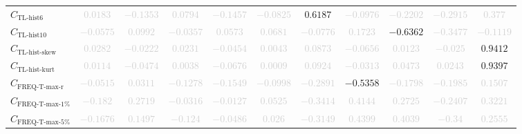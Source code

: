 \documentclass{standalone}
\newcommand{\tlhistsixname}{\text{TL-hist6}}
\newcommand{\tlhistsix}{C_{\tlhistsixname}}
\newcommand{\tlhisttenname}{\text{TL-hist10}}
\newcommand{\tlhistten}{C_{\tlhisttenname}}
\newcommand{\tlskewhistname}{\text{TL-hist-skew}}
\newcommand{\tlskewhist}{C_{\tlskewhistname}}
\newcommand{\tlkurthistname}{\text{TL-hist-kurt}}
\newcommand{\tlkurthist}{C_{\tlkurthistname}}
\newcommand{\freqmaxrname}{\text{FREQ-T-max-r}}
\newcommand{\freqmaxr}{C_{\freqmaxrname}}
\newcommand{\freqmaxonename}{\text{FREQ-T-max-1\%}}
\newcommand{\freqmaxone}{C_{\freqmaxonename}}
\newcommand{\freqmaxfivename}{\text{FREQ-T-max-5\%}}
\newcommand{\freqmaxfive}{C_{\freqmaxfivename}}
\begin{document}
\begin{tabular}{lcccccccccc}
$\tlhistsix$ & \textcolor{lightgray}{$0.0183$} & \textcolor{lightgray}{$-0.1353$} & \textcolor{lightgray}{$0.0794$} & \textcolor{lightgray}{$-0.1457$} & \textcolor{lightgray}{$-0.0825$} & $0.6187$ & \textcolor{lightgray}{$-0.0976$} & \textcolor{lightgray}{$-0.2202$} & \textcolor{lightgray}{$-0.2915$} & \textcolor{lightgray}{$0.377$} \\ 
$\tlhistten$ & \textcolor{lightgray}{$-0.0575$} & \textcolor{lightgray}{$0.0992$} & \textcolor{lightgray}{$-0.0357$} & \textcolor{lightgray}{$0.0573$} & \textcolor{lightgray}{$0.0681$} & \textcolor{lightgray}{$-0.0776$} & \textcolor{lightgray}{$0.1723$} & $-0.6362$ & \textcolor{lightgray}{$-0.3477$} & \textcolor{lightgray}{$-0.1119$} \\ 
$\tlskewhist$ & \textcolor{lightgray}{$0.0282$} & \textcolor{lightgray}{$-0.0222$} & \textcolor{lightgray}{$0.0231$} & \textcolor{lightgray}{$-0.0454$} & \textcolor{lightgray}{$0.0043$} & \textcolor{lightgray}{$0.0873$} & \textcolor{lightgray}{$-0.0656$} & \textcolor{lightgray}{$0.0123$} & \textcolor{lightgray}{$-0.025$} & $0.9412$ \\ 
$\tlkurthist$ & \textcolor{lightgray}{$0.0114$} & \textcolor{lightgray}{$-0.0474$} & \textcolor{lightgray}{$0.0038$} & \textcolor{lightgray}{$-0.0676$} & \textcolor{lightgray}{$0.0009$} & \textcolor{lightgray}{$0.0924$} & \textcolor{lightgray}{$-0.0313$} & \textcolor{lightgray}{$0.0473$} & \textcolor{lightgray}{$0.0243$} & $0.9397$ \\ 
$\freqmaxr$ & \textcolor{lightgray}{$-0.0515$} & \textcolor{lightgray}{$0.0311$} & \textcolor{lightgray}{$-0.1278$} & \textcolor{lightgray}{$-0.1549$} & \textcolor{lightgray}{$-0.0998$} & \textcolor{lightgray}{$-0.2891$} & $-0.5358$ & \textcolor{lightgray}{$-0.1798$} & \textcolor{lightgray}{$-0.1985$} & \textcolor{lightgray}{$0.1507$} \\ 
$\freqmaxone$ & \textcolor{lightgray}{$-0.182$} & \textcolor{lightgray}{$0.2719$} & \textcolor{lightgray}{$-0.0316$} & \textcolor{lightgray}{$-0.0127$} & \textcolor{lightgray}{$0.0525$} & \textcolor{lightgray}{$-0.3414$} & \textcolor{lightgray}{$0.4144$} & \textcolor{lightgray}{$0.2725$} & \textcolor{lightgray}{$-0.2407$} & \textcolor{lightgray}{$0.3221$} \\ 
$\freqmaxfive$ & \textcolor{lightgray}{$-0.1676$} & \textcolor{lightgray}{$0.1497$} & \textcolor{lightgray}{$-0.124$} & \textcolor{lightgray}{$-0.0486$} & \textcolor{lightgray}{$0.026$} & \textcolor{lightgray}{$-0.3149$} & \textcolor{lightgray}{$0.4399$} & \textcolor{lightgray}{$0.4039$} & \textcolor{lightgray}{$-0.34$} & \textcolor{lightgray}{$0.2555$} \\ 

\end{tabular}
\end{document}
